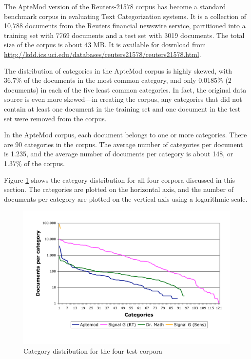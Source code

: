 The ApteMod version of the Reuters-21578 corpus has become a
standard benchmark corpus in evaluating Text Categorization
systems.\cite{yang:99} It is a collection of 10,788 documents from the
Reuters financial newswire service, partitioned into a training set with 7769
documents and a test set with 3019 documents.  The total size of the
corpus is about 43 MB.  It is available for download from
\url{http://kdd.ics.uci.edu/databases/reuters21578/reuters21578.html}.

The distribution of categories in the ApteMod corpus is highly skewed,
with 36.7\% of the documents in the most common category, and only
0.0185\% (2 documents) in each of the five least common categories.
In fact, the original data source is even more skewed---in creating
the corpus, any categories that did not contain at least one document
in the training set and one document in the test set were removed from
the corpus.\cite{yang:99}

In the ApteMod corpus, each document belongs to one or more
categories.  There are 90 categories in the corpus.  The average
number of categories per document is 1.235, and the average number of
documents per category is about 148, or 1.37\% of the corpus.

Figure \ref{Corpora-catdist} shows the category distribution for all
four corpora discussed in this section.  The categories are plotted on
the horizontal axis, and the number of documents per category are
plotted on the vertical axis using a logarithmic scale.

\begin{figure}
\begin{center}
\includegraphics[width=\linewidth]{figures/Corpora-catdist.pdf}
\caption{Category distribution for the four test corpora}
\label{Corpora-catdist}
\end{center}
\end{figure}


